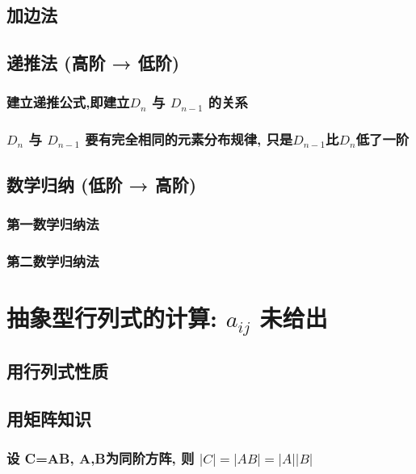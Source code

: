 \documentclass[UTF8]{ctexart}
\begin{document}
	\subsection{加边法}
	
	\subsection{递推法 (高阶 → 低阶)}
	
		\subsubsection{建立递推公式,即建立$D_n$ 与 $D_{n-1}$ 的关系}
		
		\subsubsection{$D_n$ 与 $D_{n-1}$ 要有完全相同的元素分布规律, 只是$D_{n-1}$比$D_n$低了一阶 }
	
	
	\subsection{数学归纳 (低阶 → 高阶)}
	
		\subsubsection{第一数学归纳法}
		
		\subsubsection{第二数学归纳法}
	
	
	\section{抽象型行列式的计算: $a_{ij}$ 未给出	}
	
		\subsection{用行列式性质}
		
		\subsection{用矩阵知识}
		
			\subsubsection{设 C=AB, A,B为同阶方阵, 则 $|C|=|AB|=|A||B|$}
			
\end{document}
